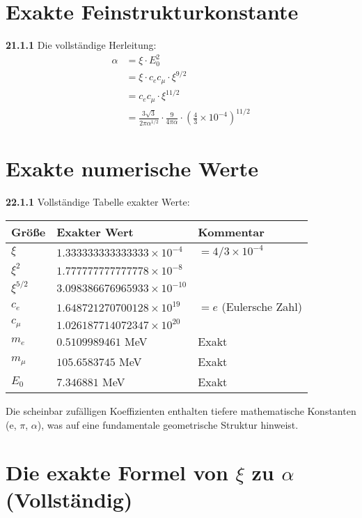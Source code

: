 \documentclass[12pt,a4paper]{article}
\begin{document}
\section{Exakte Feinstrukturkonstante}
\noindent \textbf{21.1.1} Die vollständige Herleitung:
\begin{align}
	\alpha &= \xi \cdot E_0^2 \\
	&= \xi \cdot c_e c_\mu \cdot \xi^{9/2} \\
	&= c_e c_\mu \cdot \xi^{11/2} \\
	&= \frac{3\sqrt{3}}{2\pi\alpha^{1/2}} \cdot \frac{9}{4\pi\alpha} \cdot \left(\frac{4}{3} \times 10^{-4}\right)^{11/2}
\end{align}

\section{Exakte numerische Werte}

\noindent \textbf{22.1.1} Vollständige Tabelle exakter Werte:

\begin{table}[h]
	\centering
	\begin{tabular}{lll}
		\toprule
		Größe & Exakter Wert & Kommentar \\
		\midrule
		$\xi$ & $1.333333333333333 \times 10^{-4}$ & $= 4/3 \times 10^{-4}$ \\
		$\xi^2$ & $1.777777777777778 \times 10^{-8}$ & \\
		$\xi^{5/2}$ & $3.098386676965933 \times 10^{-10}$ & \\
		$c_e$ & $1.648721270700128 \times 10^{19}$ & $= e$ (Eulersche Zahl) \\
		$c_\mu$ & $1.026187714072347 \times 10^{20}$ & \\
		$m_e$ & $0.5109989461$ MeV & Exakt \\
		$m_\mu$ & $105.6583745$ MeV & Exakt \\
		$E_0$ & $7.346881$ MeV & Exakt \\
		\bottomrule
	\end{tabular}
\end{table}

Die scheinbar zufälligen Koeffizienten enthalten tiefere mathematische Konstanten (e, $\pi$, $\alpha$), was auf eine fundamentale geometrische Struktur hinweist.

\section{Die exakte Formel von $\xi$ zu $\alpha$ (Vollständig)}
\end{document}
